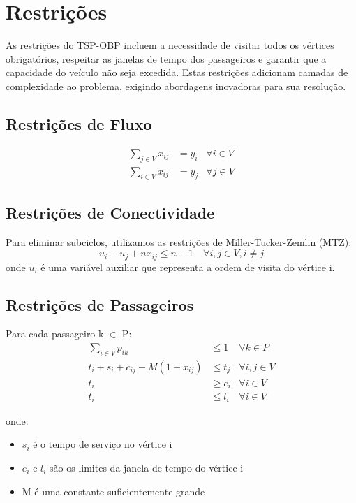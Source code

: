 \documentclass[12pt, a4paper]{report}
\begin{document}
\section{Restrições}
As restrições do TSP-OBP incluem a necessidade de visitar todos os vértices obrigatórios, respeitar as janelas de tempo dos passageiros e garantir que a capacidade do veículo não seja excedida. Estas restrições adicionam camadas de complexidade ao problema, exigindo abordagens inovadoras para sua resolução.

\subsection{Restrições de Fluxo}
\begin{align}
    \sum_{j \in V} x_{ij} &= y_i & \forall i \in V \\
    \sum_{i \in V} x_{ij} &= y_j & \forall j \in V
\end{align}

\subsection{Restrições de Conectividade}
Para eliminar subciclos, utilizamos as restrições de Miller-Tucker-Zemlin (MTZ):
\begin{equation}
    u_i - u_j + n x_{ij} \leq n-1 \quad \forall i,j \in V, i \neq j
\end{equation}
onde $u_i$ é uma variável auxiliar que representa a ordem de visita do vértice i.

\subsection{Restrições de Passageiros}
Para cada passageiro k $\in$ P:
\begin{align}
    \sum_{i \in V} p_{ik} &\leq 1 & \forall k \in P \\
    t_i + s_i + c_{ij} - M(1-x_{ij}) &\leq t_j & \forall i,j \in V \\
    t_i &\geq e_i & \forall i \in V \\
    t_i &\leq l_i & \forall i \in V
\end{align}

onde:
\begin{itemize}
    \item $s_i$ é o tempo de serviço no vértice i
    \item $e_i$ e $l_i$ são os limites da janela de tempo do vértice i
    \item M é uma constante suficientemente grande
\end{itemize}
\end{document}
